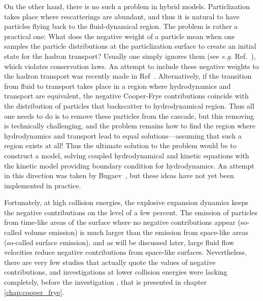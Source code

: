 On the other hand, there is no such a problem in hybrid models.  Particlization
takes place where rescatterings are abundant, and thus it is natural to have
particles flying back to the fluid-dynamical region. The problem is rather a
practical one: What does the negative weight of a particle mean when one
samples the particle distributions at the particlization surface to create an
initial state for the hadron transport? Usually one simply ignores them (see
\emph{e.g.} Ref.~\cite{Huovinen:2012is}), which violates conservation laws. An
attempt to include these negative weights to the hadron transport was recently
made in Ref~\cite{Pratt:2014vja}. Alternatively, if the transition from fluid
to transport takes place in a region where hydrodynamics and transport are
equivalent, the negative Cooper-Frye contributions coincide with the
distribution of particles that backscatter to hydrodynamical region. Thus all
one needs to do is to remove these particles from the cascade, but this
removing is technically challenging, and the problem remains how to find the
region where hydrodynamics and transport lead to equal solutions---assuming
that such a region exists at all! Thus the ultimate solution to the problem
would be to construct a model, solving coupled hydrodynamical and kinetic
equations with the kinetic model providing boundary condition for
hydrodynamics. An attempt in this direction was taken by
Bugaev~\cite{Bugaev:1999wz,Bugaev:2002ch,Bugaev:2004kq}, but these ideas have
not yet been implemented in practice.

Fortunately, at high collision energies, the explosive expansion dynamics keeps
the negative contributions on the level of a few percent. The emission of particles
from time-like areas of the surface where no negative contributions appear
(so-called volume emission) is much larger than the emission from space-like areas
(so-called surface emission), and as will be discussed later, large fluid flow
velocities reduce negative contributions from space-like surfaces. Nevertheless,
there are very few studies that actually quote the values of negative
contributions, and investigations at lower collision energies were lacking
completely, before the investigation \cite{Oliinychenko:2014tqa}, that is
presented in chapter \ref{chap:cooper_frye}.
